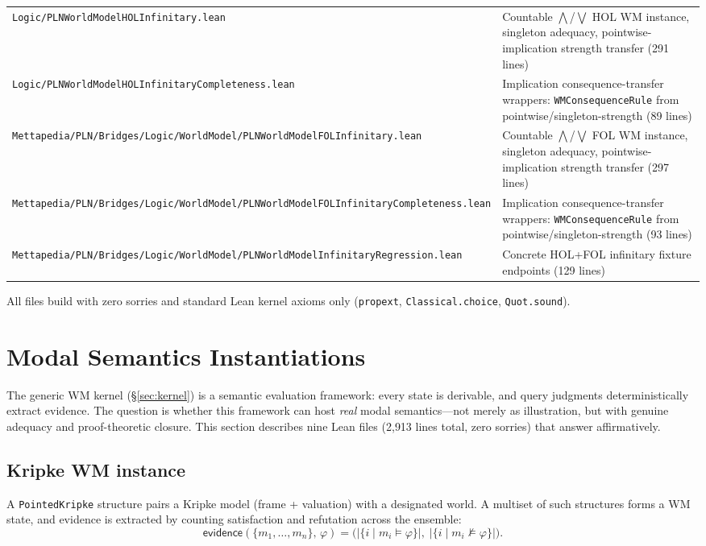 \documentclass[]{article}
\newcommand{\code}[1]{\texttt{#1}}
\newcommand{\ev}{\mathsf{evidence}}
\begin{document}
\begin{longtable}{p{}p{}}
\code{Logic/PLNWorldModelHOLInfinitary.lean} &
  Countable $\bigwedge$/$\bigvee$ HOL WM instance, singleton adequacy,
  pointwise-implication strength transfer (291 lines) \\
\code{Logic/PLNWorldModelHOLInfinitaryCompleteness.lean} &
  Implication consequence-transfer wrappers: \code{WMConsequenceRule} from
  pointwise/singleton-strength (89 lines) \\
\code{Mettapedia/PLN/Bridges/Logic/WorldModel/PLNWorldModelFOLInfinitary.lean} &
  Countable $\bigwedge$/$\bigvee$ FOL WM instance, singleton adequacy,
  pointwise-implication strength transfer (297 lines) \\
\code{Mettapedia/PLN/Bridges/Logic/WorldModel/PLNWorldModelFOLInfinitaryCompleteness.lean} &
  Implication consequence-transfer wrappers: \code{WMConsequenceRule} from
  pointwise/singleton-strength (93 lines) \\
\code{Mettapedia/PLN/Bridges/Logic/WorldModel/PLNWorldModelInfinitaryRegression.lean} &
  Concrete HOL+FOL infinitary fixture endpoints (129 lines) \\
\hline
\end{longtable}

All files build with zero sorries and standard Lean kernel axioms only
(\code{propext}, \code{Classical.choice}, \code{Quot.sound}).


\section{Modal Semantics Instantiations}
\label{sec:modal}

The generic WM kernel (\S\ref{sec:kernel}) is a semantic evaluation
framework: every state is derivable, and query judgments deterministically
extract evidence. The question is whether this framework can host
\emph{real} modal semantics---not merely as illustration, but with genuine
adequacy and proof-theoretic closure. This section describes nine Lean
files (2{,}913 lines total, zero sorries) that answer affirmatively.


\subsection{Kripke WM instance}
\label{sec:kripke-wm}

A \code{PointedKripke} structure pairs a Kripke model (frame + valuation)
with a designated world. A multiset of such structures forms a WM state,
and evidence is extracted by counting satisfaction and refutation across
the ensemble:
\[
  \ev(\{m_1,\ldots,m_n\},\,\varphi)
  = \bigl(|\{i \mid m_i \models \varphi\}|,\;
         |\{i \mid m_i \not\models \varphi\}|\bigr).
\]
\end{document}

